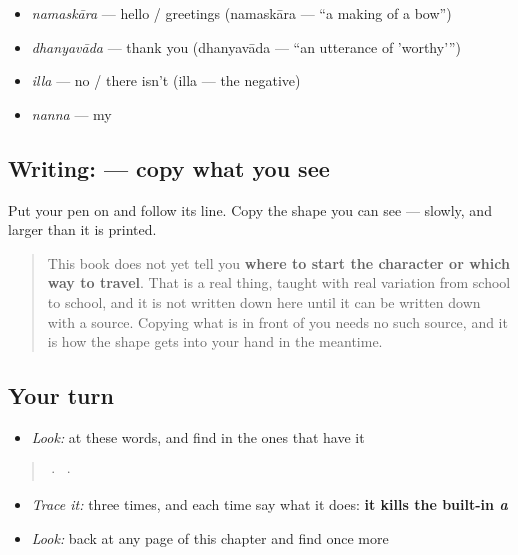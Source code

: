 \begin{itemize}
\raggedright
  \item \textbf{} \emph{namaskāra} — hello / greetings (namaskāra — \textquotedblleft{}a making of a bow\textquotedblright{})
  \item \textbf{} \emph{dhanyavāda} — thank you (dhanyavāda — \textquotedblleft{}an utterance of 'worthy'\textquotedblright{})
  \item \textbf{} \emph{illa} — no / there isn't (illa — the negative)
  \item \textbf{} \emph{nanna} — my
\end{itemize}

\subsection*{Writing:  — copy what you see}
Put your pen on  and follow its line. Copy the shape you can see — slowly, and larger than it is printed.

\begin{quote}
This book does not yet tell you \textbf{where to start the character or which way to travel}. That is a real thing, taught with real variation from school to school, and it is not written down here until it can be written down with a source. Copying what is in front of you needs no such source, and it is how the shape gets into your hand in the meantime.
\end{quote}

\subsection*{Your turn}
\begin{itemize}
\raggedright
  \item \emph{Look:} at these words, and find  in the ones that have it
\end{itemize}

\begin{quote}
  ·    ·  
\end{quote}

\begin{itemize}
\raggedright
  \item \emph{Trace it:}  three times, and each time say what it does: \textbf{it kills the built-in \emph{a}}
  \item \emph{Look:} back at any page of this chapter and find  once more
\end{itemize}

